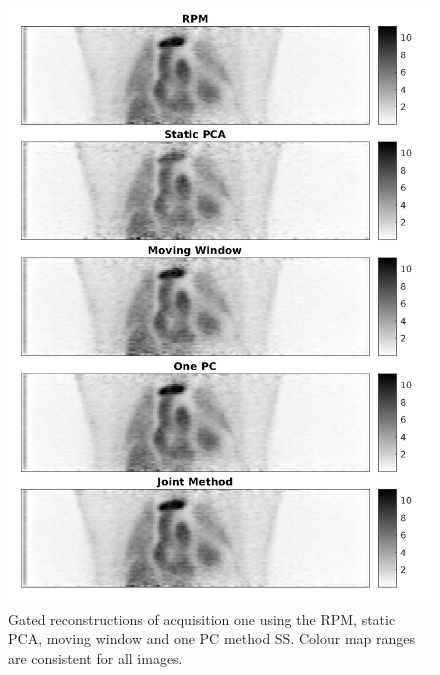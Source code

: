             \begin{figure}
                \centering
                
                \includegraphics[width=0.8\linewidth]{figures/data_driven_surrogate_signal_extraction_results_1_visual_analysis_pca.png}
                
                \captionsetup{singlelinecheck=false, justification=centering}
                \caption{Gated reconstructions of acquisition one using the \gls{RPM}, static \gls{PCA}, moving window and one \gls{PC} method \gls{SS}. Colour map ranges are consistent for all images.}
                \label{fig:pca_data_driven_surrogate_signal_extraction_methods_for_dynamic_pet_results_visual_analysis}
            \end{figure}
            
